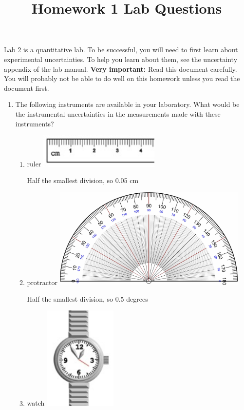 \documentclass{article}
\begin{document}
\title{Homework 1 Lab Questions}
	
\maketitle

Lab 2 is a quantitative lab. To be successful, you will need to first learn about experimental uncertainties. To help you learn about them, see the uncertainty appendix of the lab manual. \textbf{Very important:} Read this document carefully. You will probably not be able to do well on this homework unless you read the document first.

\begin{enumerate}
	\item\label{fm1:qu:instrument} The following instruments are available in your laboratory. What would be the instrumental uncertainties in the measurements made with these instruments?
	
	\begin{enumerate}
		\item ruler
		\includegraphics[width=0.5\textwidth]{ruler.jpg}
		
		\begin{solution}
			Half the smallest division, so 0.05 cm
		\end{solution}
		
		\item protractor
		\includegraphics[width=0.8\textwidth]{Protractor_Rapporteur_Degrees_V3.jpg}
		
		\begin{solution}
			Half the smallest division, so 0.5 degrees
		\end{solution}
		
		\item watch
		\includegraphics[width=0.3\textwidth]{watch.jpg}
		

\end{enumerate}
\end{enumerate}
\end{document}
